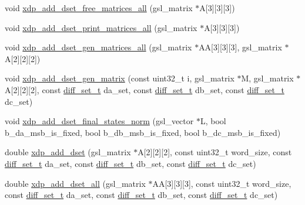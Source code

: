 \begin{DoxyCompactItemize}
\item 
void \hyperlink{xdp-add-diff-set_8cc_a71dd8f70100ab3eaaa2dbc2ff0394507}{xdp\-\_\-add\-\_\-dset\-\_\-free\-\_\-matrices\-\_\-all} (gsl\-\_\-matrix $\ast$\-A\mbox{[}3\mbox{]}\mbox{[}3\mbox{]}\mbox{[}3\mbox{]})
\item 
void \hyperlink{xdp-add-diff-set_8cc_a3716a9725156ea1dfec064f49a098d73}{xdp\-\_\-add\-\_\-dset\-\_\-print\-\_\-matrices\-\_\-all} (gsl\-\_\-matrix $\ast$\-A\mbox{[}3\mbox{]}\mbox{[}3\mbox{]}\mbox{[}3\mbox{]})
\item 
void \hyperlink{xdp-add-diff-set_8cc_a4690a51a4f31ebebe2f3d96367a0f977}{xdp\-\_\-add\-\_\-dset\-\_\-gen\-\_\-matrices\-\_\-all} (gsl\-\_\-matrix $\ast$\-A\-A\mbox{[}3\mbox{]}\mbox{[}3\mbox{]}\mbox{[}3\mbox{]}, gsl\-\_\-matrix $\ast$\-A\mbox{[}2\mbox{]}\mbox{[}2\mbox{]}\mbox{[}2\mbox{]})
\item 
void \hyperlink{xdp-add-diff-set_8cc_abd7268d57bd7172e01c396f999db8360}{xdp\-\_\-add\-\_\-dset\-\_\-gen\-\_\-matrix} (const uint32\-\_\-t i, gsl\-\_\-matrix $\ast$\-M, gsl\-\_\-matrix $\ast$\-A\mbox{[}2\mbox{]}\mbox{[}2\mbox{]}\mbox{[}2\mbox{]}, const \hyperlink{structdiff__set__t}{diff\-\_\-set\-\_\-t} da\-\_\-set, const \hyperlink{structdiff__set__t}{diff\-\_\-set\-\_\-t} db\-\_\-set, const \hyperlink{structdiff__set__t}{diff\-\_\-set\-\_\-t} dc\-\_\-set)
\item 
void \hyperlink{xdp-add-diff-set_8cc_ac6d1f73ccbaa9c8df45ea48aad955519}{xdp\-\_\-add\-\_\-dset\-\_\-final\-\_\-states\-\_\-norm} (gsl\-\_\-vector $\ast$\-L, bool b\-\_\-da\-\_\-msb\-\_\-is\-\_\-fixed, bool b\-\_\-db\-\_\-msb\-\_\-is\-\_\-fixed, bool b\-\_\-dc\-\_\-msb\-\_\-is\-\_\-fixed)
\item 
double \hyperlink{xdp-add-diff-set_8cc_aad57cdbd50f995cbb7a6c23528f12f67}{xdp\-\_\-add\-\_\-dset} (gsl\-\_\-matrix $\ast$\-A\mbox{[}2\mbox{]}\mbox{[}2\mbox{]}\mbox{[}2\mbox{]}, const uint32\-\_\-t word\-\_\-size, const \hyperlink{structdiff__set__t}{diff\-\_\-set\-\_\-t} da\-\_\-set, const \hyperlink{structdiff__set__t}{diff\-\_\-set\-\_\-t} db\-\_\-set, const \hyperlink{structdiff__set__t}{diff\-\_\-set\-\_\-t} dc\-\_\-set)
\item 
double \hyperlink{xdp-add-diff-set_8cc_a2a0df79e63c1cb80d2508ba605bbd2b3}{xdp\-\_\-add\-\_\-dset\-\_\-all} (gsl\-\_\-matrix $\ast$\-A\-A\mbox{[}3\mbox{]}\mbox{[}3\mbox{]}\mbox{[}3\mbox{]}, const uint32\-\_\-t word\-\_\-size, const \hyperlink{structdiff__set__t}{diff\-\_\-set\-\_\-t} da\-\_\-set, const \hyperlink{structdiff__set__t}{diff\-\_\-set\-\_\-t} db\-\_\-set, const \hyperlink{structdiff__set__t}{diff\-\_\-set\-\_\-t} dc\-\_\-set)

\end{DoxyCompactItemize}

